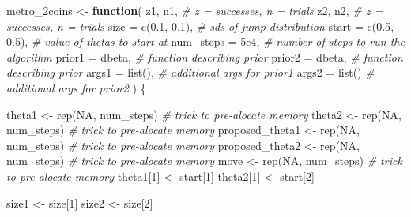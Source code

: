 \documentclass[
  12pt,
]{book}
\newenvironment{Shaded}{\begin{snugshade}}{\end{snugshade}}
\newcommand{\AttributeTok}[1]{\textcolor[rgb]{0.77,0.63,0.00}{#1}}
\newcommand{\CommentTok}[1]{\textcolor[rgb]{0.56,0.35,0.01}{\textit{#1}}}
\newcommand{\ConstantTok}[1]{\textcolor[rgb]{0.00,0.00,0.00}{#1}}
\newcommand{\ControlFlowTok}[1]{\textcolor[rgb]{0.13,0.29,0.53}{\textbf{#1}}}
\newcommand{\DecValTok}[1]{\textcolor[rgb]{0.00,0.00,0.81}{#1}}
\newcommand{\FloatTok}[1]{\textcolor[rgb]{0.00,0.00,0.81}{#1}}
\newcommand{\FunctionTok}[1]{\textcolor[rgb]{0.00,0.00,0.00}{#1}}
\newcommand{\NormalTok}[1]{#1}
\newcommand{\OtherTok}[1]{\textcolor[rgb]{0.56,0.35,0.01}{#1}}
\theoremstyle{definition}
\theoremstyle{definition}
\theoremstyle{definition}
\theoremstyle{remark}
\begin{document}
\begin{Shaded}
\begin{Highlighting}[]
\NormalTok{metro\_2coins }\OtherTok{\textless{}{-}} \ControlFlowTok{function}\NormalTok{(}
\NormalTok{  z1, n1,              }\CommentTok{\# z = successes, n = trials}
\NormalTok{  z2, n2,              }\CommentTok{\# z = successes, n = trials}
  \AttributeTok{size  =} \FunctionTok{c}\NormalTok{(}\FloatTok{0.1}\NormalTok{, }\FloatTok{0.1}\NormalTok{), }\CommentTok{\# sds of jump distribution}
  \AttributeTok{start =} \FunctionTok{c}\NormalTok{(}\FloatTok{0.5}\NormalTok{, }\FloatTok{0.5}\NormalTok{), }\CommentTok{\# value of thetas to start at}
  \AttributeTok{num\_steps =} \FloatTok{5e4}\NormalTok{,     }\CommentTok{\# number of steps to run the algorithm}
  \AttributeTok{prior1 =}\NormalTok{ dbeta,      }\CommentTok{\# function describing prior}
  \AttributeTok{prior2 =}\NormalTok{ dbeta,      }\CommentTok{\# function describing prior}
  \AttributeTok{args1 =} \FunctionTok{list}\NormalTok{(),      }\CommentTok{\# additional args for prior1}
  \AttributeTok{args2 =} \FunctionTok{list}\NormalTok{()      }\CommentTok{\# additional args for prior2}
\NormalTok{  ) \{}
  
\NormalTok{  theta1            }\OtherTok{\textless{}{-}} \FunctionTok{rep}\NormalTok{(}\ConstantTok{NA}\NormalTok{, num\_steps)  }\CommentTok{\# trick to pre{-}alocate memory}
\NormalTok{  theta2            }\OtherTok{\textless{}{-}} \FunctionTok{rep}\NormalTok{(}\ConstantTok{NA}\NormalTok{, num\_steps)  }\CommentTok{\# trick to pre{-}alocate memory}
\NormalTok{  proposed\_theta1   }\OtherTok{\textless{}{-}} \FunctionTok{rep}\NormalTok{(}\ConstantTok{NA}\NormalTok{, num\_steps)  }\CommentTok{\# trick to pre{-}alocate memory}
\NormalTok{  proposed\_theta2   }\OtherTok{\textless{}{-}} \FunctionTok{rep}\NormalTok{(}\ConstantTok{NA}\NormalTok{, num\_steps)  }\CommentTok{\# trick to pre{-}alocate memory}
\NormalTok{  move              }\OtherTok{\textless{}{-}} \FunctionTok{rep}\NormalTok{(}\ConstantTok{NA}\NormalTok{, num\_steps)  }\CommentTok{\# trick to pre{-}alocate memory}
\NormalTok{  theta1[}\DecValTok{1}\NormalTok{]         }\OtherTok{\textless{}{-}}\NormalTok{ start[}\DecValTok{1}\NormalTok{]}
\NormalTok{  theta2[}\DecValTok{1}\NormalTok{]         }\OtherTok{\textless{}{-}}\NormalTok{ start[}\DecValTok{2}\NormalTok{]}

\NormalTok{  size1 }\OtherTok{\textless{}{-}}\NormalTok{ size[}\DecValTok{1}\NormalTok{] }
\NormalTok{  size2 }\OtherTok{\textless{}{-}}\NormalTok{ size[}\DecValTok{2}\NormalTok{] }
  

\end{Highlighting}
\end{Shaded}
\end{document}
